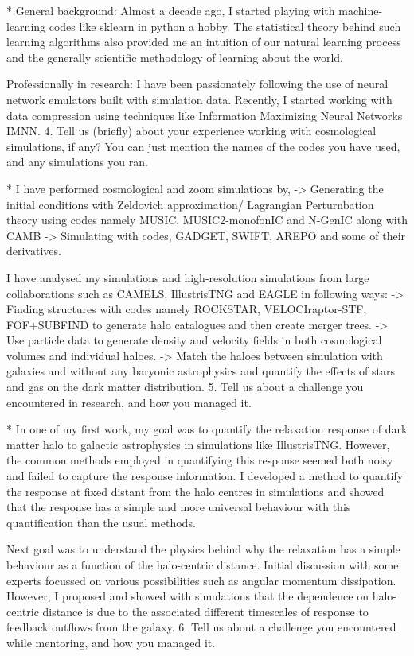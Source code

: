 *
General background:
Almost a decade ago, I started playing with machine-learning codes like sklearn in python a hobby. The statistical theory behind such learning algorithms also provided me an intuition of our natural learning process and the generally scientific methodology of learning about the world. 

Professionally in research:
I have been passionately following the use of neural network emulators built with simulation data. Recently, I started working with data compression using techniques like Information Maximizing Neural Networks IMNN.
4. Tell us (briefly) about your experience working with cosmological simulations, if any? You can just mention the names of the codes you have used, and any simulations you ran.

*
I have performed cosmological and zoom simulations by,
-> Generating the initial conditions with Zeldovich approximation/ Lagrangian Perturnbation theory using codes namely MUSIC, MUSIC2-monofonIC and N-GenIC along with CAMB
-> Simulating with codes, GADGET, SWIFT, AREPO and some of their derivatives.

I have analysed my simulations and high-resolution simulations from large collaborations such as CAMELS, IllustrisTNG and EAGLE in following ways:
-> Finding structures with codes namely ROCKSTAR, VELOCIraptor-STF, FOF+SUBFIND to generate halo catalogues and then create merger trees.
-> Use particle data to generate density and velocity fields in both cosmological volumes and individual haloes.
-> Match the haloes between simulation with galaxies and without any baryonic astrophysics and quantify the effects of stars and gas on the dark matter distribution.
5. Tell us about a challenge you encountered in research, and how you managed it. 

*
In one of my first work, my goal was to quantify the relaxation response of dark matter halo to galactic astrophysics in simulations like IllustrisTNG. However, the common methods employed in quantifying this response seemed both noisy and failed to capture the response  information. I developed a method to quantify the response at fixed distant from the halo centres in simulations and showed that the response has a simple and more universal behaviour with this quantification than the usual methods.

Next goal was to understand the physics behind why the relaxation has a simple behaviour as a function of the halo-centric distance. Initial discussion with some experts focussed on various possibilities such as angular momentum dissipation. However, I proposed and showed with simulations that the dependence on halo-centric distance is due to the associated different timescales of response to feedback outflows from the galaxy.
6. Tell us about a challenge you encountered while mentoring, and how you managed it. 

